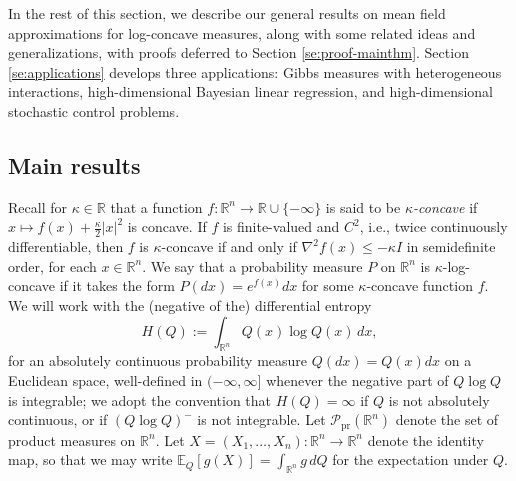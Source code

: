 \documentclass[11pt,reqno]{amsart}
\numberwithin{equation}{section}
\theoremstyle{definition}
\def\E{{\mathbb E}}
\def\R{{\mathbb R}}
\def\P{{\mathcal P}}
\def\Pprod{\P_{\mathrm{pr}}}
\begin{document}
	In the rest of this section, we describe our general results on mean field approximations for log-concave measures, 
	along with some related ideas and generalizations,
	with proofs deferred to Section \ref{se:proof-mainthm}.
 Section \ref{se:applications} develops three applications: Gibbs measures with heterogeneous interactions, high-dimensional Bayesian linear regression, and high-dimensional stochastic control problems.



\subsection{Main results}

Recall for $\kappa \in \R$ that a function $f : \R^n \to \R \cup \{-\infty\}$ is said to be \emph{$\kappa$-concave} if $x\mapsto f(x) + \frac{\kappa}{2}|x|^2$ is concave.
If $f$ is finite-valued and $C^2$, i.e., twice continuously differentiable, then $f$ is $\kappa$-concave if and only if $\nabla^2f(x) \le -\kappa I$ in semidefinite order, for each $x \in \R^n$. We say that a probability measure $P$ on $\R^n$ is $\kappa$-log-concave if it takes the form $P(dx)=e^{f(x)}dx$ for some $\kappa$-concave function $f$.
We will work with the (negative of the) differential entropy
\begin{equation*}
	H(Q) := \int_{\R^n} Q(x) \log Q(x) \, dx, \label{eq: diff.entropy}
\end{equation*}
for an absolutely continuous probability measure $Q(dx)=Q(x)dx$ on a Euclidean space, well-defined in $(-\infty,\infty]$ whenever the negative part of $Q\log Q$ is integrable; we adopt the convention that $H(Q)=\infty$ if $Q$ is not absolutely continuous, or if $(Q\log Q)^-$ is not integrable. 
Let $\Pprod(\R^n)$ denote the set of product measures on $\R^n$. Let $X =(X_1,\ldots,X_n) : \R^n \to \R^n$ denote the identity map, so that we may write $\E_Q[g(X)]=\int_{\R^n} g\,dQ$ for the expectation under $Q$.
\end{document}
